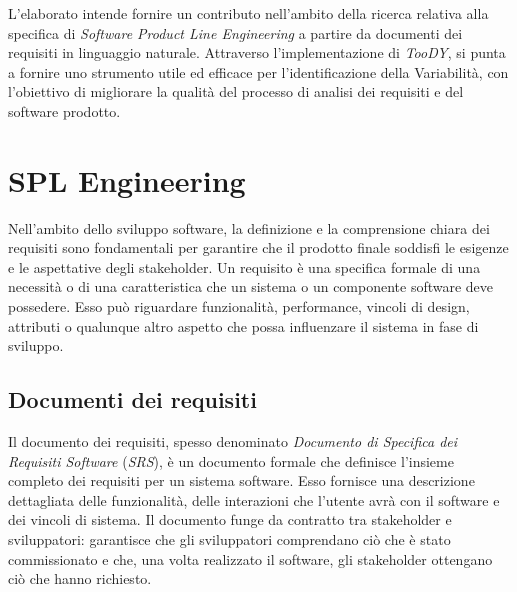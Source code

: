 \documentclass[12pt]{report}
\newcommand{\toody}{\textsl{TooDY}\xspace}
\newcommand{\srs}{\textsl{SRS}\xspace}
\begin{document}

\noindent L’elaborato intende fornire un contributo nell’ambito della ricerca relativa alla specifica di \textit{Software Product Line Engineering} a partire da documenti dei requisiti in linguaggio naturale. Attraverso l’implementazione di \toody, si punta a fornire uno strumento utile ed efficace per l’identificazione della Variabilità, con l’obiettivo di migliorare la qualità del processo di analisi dei requisiti e del software prodotto.


\clearpage\thispagestyle{empty}
\null\newpage




\chapter{SPL Engineering}
\label{sec:sple}
Nell'ambito dello sviluppo software, la definizione e la comprensione chiara dei requisiti sono fondamentali per garantire che il prodotto finale soddisfi le esigenze e le aspettative degli stakeholder. Un requisito è una specifica formale di una necessità o di una caratteristica che un sistema o un componente software deve possedere. Esso può riguardare funzionalità, performance, vincoli di design, attributi o qualunque altro aspetto che possa influenzare il sistema in fase di sviluppo.


\section{Documenti dei requisiti}
Il documento dei requisiti, spesso denominato \textit{Documento di Specifica dei Requisiti Software} (\srs), è un documento formale che definisce l'insieme completo dei requisiti per un sistema software. Esso fornisce una descrizione dettagliata delle funzionalità, delle interazioni che l'utente avrà con il software e dei vincoli di sistema. Il documento funge da contratto tra stakeholder e sviluppatori: garantisce che gli sviluppatori comprendano ciò che è stato commissionato e che, una volta realizzato il software, gli stakeholder ottengano ciò che hanno richiesto.
\end{document}
